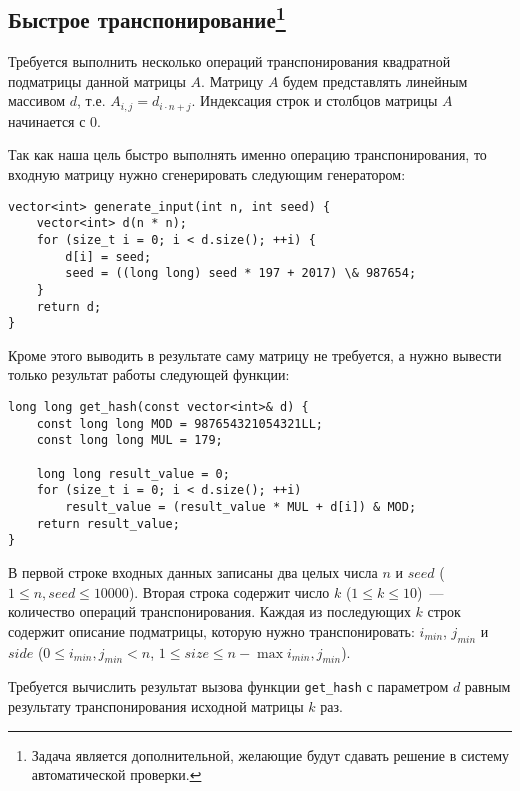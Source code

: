 \subsection{Быстрое транспонирование\footnote{Задача является дополнительной, желающие будут сдавать решение в систему автоматической проверки.}}

Требуется выполнить несколько операций транспонирования квадратной подматрицы данной матрицы $A$.
Матрицу $A$ будем представлять линейным массивом $d$, т.е. $A_{i,j} = d_{i \cdot n + j}$.
Индексация строк и столбцов матрицы $A$ начинается с 0.

Так как наша цель быстро выполнять именно операцию транспонирования, то входную матрицу нужно сгенерировать следующим генератором:
\begin{verbatim}
vector<int> generate_input(int n, int seed) {
    vector<int> d(n * n);
    for (size_t i = 0; i < d.size(); ++i) {
        d[i] = seed;
        seed = ((long long) seed * 197 + 2017) \& 987654;
    }
    return d;
}
\end{verbatim}

Кроме этого выводить в результате саму матрицу не требуется, а нужно вывести только результат работы следующей функции:
\begin{verbatim}
long long get_hash(const vector<int>& d) {
    const long long MOD = 987654321054321LL;
    const long long MUL = 179;

    long long result_value = 0;
    for (size_t i = 0; i < d.size(); ++i)
        result_value = (result_value * MUL + d[i]) & MOD;
    return result_value;
}
\end{verbatim}

В первой строке входных данных записаны два целых числа $n$ и $seed$ ($1 \le n, seed \le 10000$).
Вторая строка содержит число $k$ ($1 \le k \le 10$)~--- количество операций транспонирования.
Каждая из последующих $k$ строк содержит описание подматрицы,
которую нужно транспонировать: $i_{min}$, $j_{min}$ и $side$ ($0 \le i_{min}, j_{min} < n$, $1 \le size \le n - \max{i_{min}, j_{min}}$).

Требуется вычислить результат вызова функции \texttt{get\_hash} с параметром $d$ равным результату транспонирования исходной матрицы $k$ раз.
